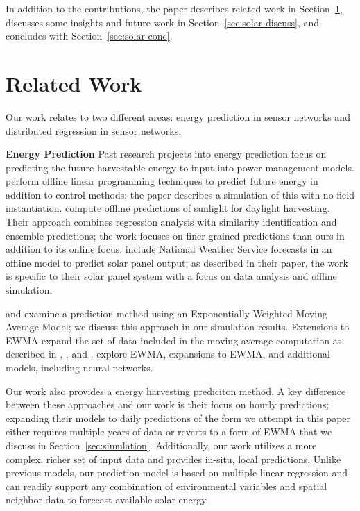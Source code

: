 \documentclass[prodmode,acmtosn]{acmsmall}
\begin{document}
In addition to the contributions, the paper describes related work in Section~\ref{sec:solar-related}, discusses some insights and future work in Section~\ref{sec:solar-discuss}, and concludes with Section~\ref{sec:solar-conc}.

\section{Related Work} \label{sec:solar-related}
Our work relates to two different areas: energy prediction in sensor networks and distributed regression in sensor networks. \newline

{\bf Energy Prediction}\newline 
Past research projects into energy prediction focus on predicting the future harvestable energy to input into power management models.
\cite{moserDAT2008} perform offline linear programming techniques to predict future energy in addition to control methods; the paper describes a simulation of this with no field instantiation.
\cite{Lu:2012:SFP:2185677.2185738} compute offline predictions of sunlight for daylight harvesting.
Their approach combines regression analysis with similarity identification and ensemble predictions; the work focuses on finer-grained predictions than ours in addition to its online focus.
\cite{5508260} include National Weather Service forecasts in an offline model to predict solar panel output; as described in their paper, the work is specific to their solar panel system with a focus on data analysis and offline simulation.

\cite{hsuISPLED2006} and \cite{kansalDAC2006} examine a prediction method using an Exponentially Weighted Moving Average Model; we discuss this approach in our simulation results.
Extensions to EWMA expand the set of data included in the moving average computation as described in \cite{5934952}, \cite{5601116}, and \cite{5172412}. 
\cite{Bergonzini2010766} explore EWMA, expansions to EWMA, and additional models, including neural networks.

Our work also provides a energy harvesting prediciton method.
A key difference between these approaches and our work is their focus on hourly predictions; expanding their models to daily predictions of the form we attempt in this paper either requires multiple years of data or reverts to a form of EWMA that we discuss in Section~\ref{sec:simulation}. 
Additionally, our work utilizes a more complex, richer set of input data and provides in-situ, local predictions.
Unlike previous models, our prediction model is based on multiple linear regression and can readily support any combination of environmental variables and spatial neighbor data to forecast available solar energy.\newline
\end{document}
